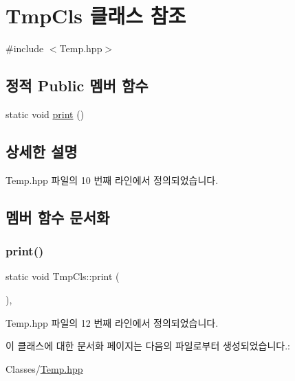 \hypertarget{class_tmp_cls}{}\section{Tmp\+Cls 클래스 참조}
\label{class_tmp_cls}


{\ttfamily \#include $<$Temp.\+hpp$>$}

\subsection*{정적 Public 멤버 함수}
\begin{DoxyCompactItemize}
\item 
static void \hyperlink{class_tmp_cls_a1f0f7804e9a13c4a3e34f697ec2a49d5}{print} ()
\end{DoxyCompactItemize}


\subsection{상세한 설명}


Temp.\+hpp 파일의 10 번째 라인에서 정의되었습니다.



\subsection{멤버 함수 문서화}
\mbox{\label{class_tmp_cls_a1f0f7804e9a13c4a3e34f697ec2a49d5}} 
\subsubsection{\texorpdfstring{print()}{print()}}
{\footnotesize\ttfamily static void Tmp\+Cls\+::print (\begin{DoxyParamCaption}{ }\end{DoxyParamCaption})\hspace{0.3cm}{\ttfamily [inline]}, {\ttfamily [static]}}



Temp.\+hpp 파일의 12 번째 라인에서 정의되었습니다.



이 클래스에 대한 문서화 페이지는 다음의 파일로부터 생성되었습니다.\+:\begin{DoxyCompactItemize}
\item 
Classes/\hyperlink{_temp_8hpp}{Temp.\+hpp}\end{DoxyCompactItemize}
